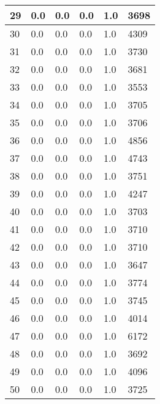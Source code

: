 \begin{longtable}{|l|l|l|l|l|l|}
29 & 0.0 & 0.0 & 0.0 & 1.0 & 3698 \\ \hline 
30 & 0.0 & 0.0 & 0.0 & 1.0 & 4309 \\ \hline 
31 & 0.0 & 0.0 & 0.0 & 1.0 & 3730 \\ \hline 
32 & 0.0 & 0.0 & 0.0 & 1.0 & 3681 \\ \hline 
33 & 0.0 & 0.0 & 0.0 & 1.0 & 3553 \\ \hline 
34 & 0.0 & 0.0 & 0.0 & 1.0 & 3705 \\ \hline 
35 & 0.0 & 0.0 & 0.0 & 1.0 & 3706 \\ \hline 
36 & 0.0 & 0.0 & 0.0 & 1.0 & 4856 \\ \hline 
37 & 0.0 & 0.0 & 0.0 & 1.0 & 4743 \\ \hline 
38 & 0.0 & 0.0 & 0.0 & 1.0 & 3751 \\ \hline 
39 & 0.0 & 0.0 & 0.0 & 1.0 & 4247 \\ \hline 
40 & 0.0 & 0.0 & 0.0 & 1.0 & 3703 \\ \hline 
41 & 0.0 & 0.0 & 0.0 & 1.0 & 3710 \\ \hline 
42 & 0.0 & 0.0 & 0.0 & 1.0 & 3710 \\ \hline 
43 & 0.0 & 0.0 & 0.0 & 1.0 & 3647 \\ \hline 
44 & 0.0 & 0.0 & 0.0 & 1.0 & 3774 \\ \hline 
45 & 0.0 & 0.0 & 0.0 & 1.0 & 3745 \\ \hline 
46 & 0.0 & 0.0 & 0.0 & 1.0 & 4014 \\ \hline 
47 & 0.0 & 0.0 & 0.0 & 1.0 & 6172 \\ \hline 
48 & 0.0 & 0.0 & 0.0 & 1.0 & 3692 \\ \hline 
49 & 0.0 & 0.0 & 0.0 & 1.0 & 4096 \\ \hline 
50 & 0.0 & 0.0 & 0.0 & 1.0 & 3725 \\ \hline 
\end{longtable}